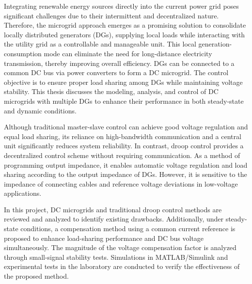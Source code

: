 \newpage
{}
Integrating renewable energy sources directly into the current power grid poses significant challenges due to their intermittent and decentralized nature. Therefore, the microgrid approach emerges as a promising solution to consolidate locally distributed generators (DGs), supplying local loads while interacting with the utility grid as a controllable and manageable unit. This local generation-consumption mode can eliminate the need for long-distance electricity transmission, thereby improving overall efficiency. DGs can be connected to a common DC bus via power converters to form a DC microgrid. The control objective is to ensure proper load sharing among DGs while maintaining voltage stability. This thesis discusses the modeling, analysis, and control of DC microgrids with multiple DGs to enhance their performance in both steady-state and dynamic conditions. \par
Although traditional master-slave control can achieve good voltage regulation and equal load sharing, its reliance on high-bandwidth communication and a central unit significantly reduces system reliability. In contrast, droop control provides a decentralized control scheme without requiring communication. As a method of programming output impedance, it enables automatic voltage regulation and load sharing according to the output impedance of DGs. However, it is sensitive to the impedance of connecting cables and reference voltage deviations in low-voltage applications. \par
In this project, DC microgrids and traditional droop control methods are reviewed and analyzed to identify existing drawbacks. Additionally, under steady-state conditions, a compensation method using a common current reference is proposed to enhance load-sharing performance and DC bus voltage simultaneously. The magnitude of the voltage compensation factor is analyzed through small-signal stability tests. Simulations in MATLAB/Simulink and experimental tests in the laboratory are conducted to verify the effectiveness of the proposed method. \par